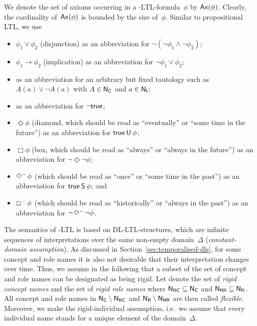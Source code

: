 \noindent
We denote the set of axioms occurring in a \SHOQ-LTL-formula~$\phi$ by
$\operatorname{\mathsf{Ax}}(\phi)$.  Clearly, the cardinality of~$\operatorname{\mathsf{Ax}}(\phi)$ is bounded by the size
of~$\phi$.  Similar to propositional LTL, we use
\begin{itemize}
    \item $\phi_1\lor\phi_2$ (disjunction) as an abbreviation for
        $\lnot(\lnot\phi_1\land\lnot\phi_2)$;
    \item $\phi_1\to\phi_2$ (implication) as an abbreviation for
        $\lnot\phi_1\lor\phi_2$;
    \item \true as an abbreviation for an arbitrary but fixed
        tautology such as $A(a)\lor\lnot A(a)$ with $A\in\mathsf{N_C}$ and $a\in\mathsf{N_I}$;
    \item \false as an abbreviation for $\lnot\mathsf{true}$;
    \item $\Diamond\phi$ (diamond, which should be read as \enquote{eventually}
        or \enquote{some time in the future}) as an abbreviation for
        $\mathsf{true}\mathbin{\mathsf{U}}\phi$;
    \item $\Box\phi$ (box, which should be read as \enquote{always} or
        \enquote{always in the future}) as an abbreviation for
        $\lnot\Diamond\lnot\phi$;
    \item $\Diamondm\phi$ (which should be read as \enquote{once}
        or \enquote{some time in the past}) as an abbreviation for
        $\mathsf{true}\mathbin{\mathsf{S}}\phi$; and
    \item $\Boxm\phi$ (which should be read as \enquote{historically} or
        \enquote{always in the past}) as an abbreviation for
        $\lnot\Diamondm\lnot\phi$.
\end{itemize}

The semantics of \SHOQ-LTL is based on DL-LTL-structures, which are infinite
sequences of interpretations over the same non-empty domain~$\Delta$
(\emph{constant-domain assumption}).
%
As discussed in Section~\ref{sec:temporalised-dls}, for some concept and role
names it is also not desirable that their interpretation changes over time.
%
Thus, we assume in the following that a subset of the set of concept and role
names can be designated as being rigid.  Let \NRC denote the set of \emph{rigid
concept names} and \NRR the set of \emph{rigid role names} where
$\mathsf{N_{RC}}\subseteq\mathsf{N_C}$ and $\mathsf{N_{RR}}\subseteq\mathsf{N_R}$.  All concept and role names in
$\mathsf{N_C}\setminus\mathsf{N_{RC}}$ and $\mathsf{N_R}\setminus\mathsf{N_{RR}}$ are then called \emph{flexible}.
%
Moreover, we make the rigid-individual assumption, i.e.~we assume that every
individual name stands for a unique element of the domain~$\Delta$.

